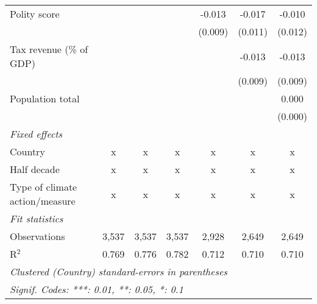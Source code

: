 \begin{tabular}{lcccccc}
   Polity score                                                  &               &               &                & -0.013         & -0.017         & -0.010\\   
                                                                 &               &               &                & (0.009)        & (0.011)        & (0.012)\\   
   Tax revenue (\% of GDP)                                       &               &               &                &                & -0.013         & -0.013\\   
                                                                 &               &               &                &                & (0.009)        & (0.009)\\   
   Population total                                              &               &               &                &                &                & 0.000\\   
                                                                 &               &               &                &                &                & (0.000)\\   
   \emph{Fixed effects}\\
   Country                                                       & x             & x             & x              & x              & x              & x\\  
   Half decade                                                   & x             & x             & x              & x              & x              & x\\  
   Type of climate action/measure                                & x             & x             & x              & x              & x              & x\\  
   \midrule \emph{Fit statistics}\\
   Observations                                                  & 3,537         & 3,537         & 3,537          & 2,928          & 2,649          & 2,649\\  
   R$^2$                                                         & 0.769         & 0.776         & 0.782          & 0.712          & 0.710          & 0.710\\  
   \midrule
   \multicolumn{7}{l}{\emph{Clustered (Country) standard-errors in parentheses}}\\
   \multicolumn{7}{l}{\emph{Signif. Codes: ***: 0.01, **: 0.05, *: 0.1}}\\
\end{tabular}
\par\endgroup


